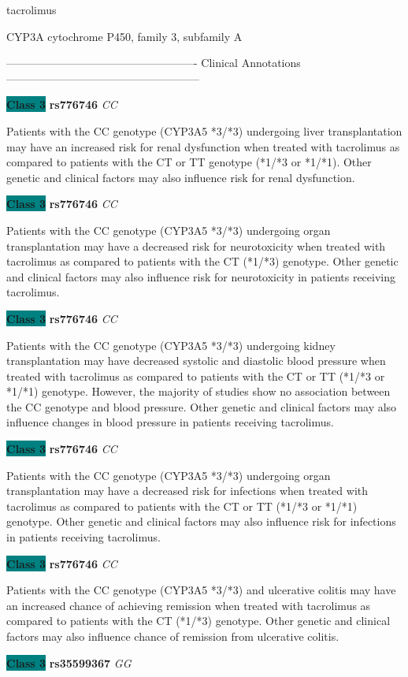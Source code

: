 \documentclass{resume} %
\begin{document}
\begin{rSection}{ tacrolimus }
\begin{rSubsection}{ CYP3A }{ cytochrome P450, family 3, subfamily A }{}{}
\item[] ---------------------------------------------------- Clinical Annotations -----------------------------------------------------\newline
\item \textbf{\colorbox{teal} {Class 3}} \textbf{ rs776746 } \textit{ CC }
\item[] Patients with the CC genotype (CYP3A5 *3/*3) undergoing liver transplantation may have an increased risk for renal dysfunction when treated with tacrolimus as compared to patients with the CT or TT genotype (*1/*3 or *1/*1). Other genetic and clinical factors may also influence risk for renal dysfunction. \item \textbf{\colorbox{teal} {Class 3}} \textbf{ rs776746 } \textit{ CC }
\item[] Patients with the CC genotype (CYP3A5 *3/*3) undergoing organ transplantation may have a decreased risk for neurotoxicity when treated with tacrolimus as compared to patients with the CT (*1/*3) genotype. Other genetic and clinical factors may also influence risk for neurotoxicity in patients receiving tacrolimus. \item \textbf{\colorbox{teal} {Class 3}} \textbf{ rs776746 } \textit{ CC }
\item[] Patients with the CC genotype (CYP3A5 *3/*3) undergoing kidney transplantation may have decreased systolic and diastolic blood pressure when treated with tacrolimus as compared to patients with the CT or TT (*1/*3 or *1/*1) genotype. However, the majority of studies show no association between the CC genotype and blood pressure. Other genetic and clinical factors may also influence changes in blood pressure in patients receiving tacrolimus.\item \textbf{\colorbox{teal} {Class 3}} \textbf{ rs776746 } \textit{ CC }
\item[] Patients with the CC genotype (CYP3A5 *3/*3) undergoing organ transplantation may have a decreased risk for infections when treated with tacrolimus as compared to patients with the CT or TT (*1/*3 or *1/*1) genotype. Other genetic and clinical factors may also influence risk for infections in patients receiving tacrolimus.\item \textbf{\colorbox{teal} {Class 3}} \textbf{ rs776746 } \textit{ CC }
\item[] Patients with the CC genotype (CYP3A5 *3/*3) and ulcerative colitis may have an increased chance of achieving remission when treated with tacrolimus as compared to patients with the CT (*1/*3) genotype. Other genetic and clinical factors may also influence chance of remission from ulcerative colitis. \item \textbf{\colorbox{teal} {Class 3}} \textbf{ rs35599367 } \textit{ GG }

\end{rSubsection}
\end{rSection}
\end{document}
